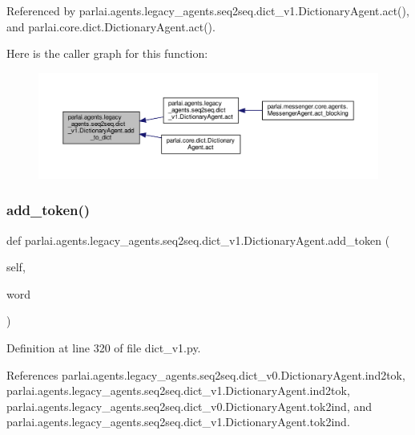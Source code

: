 Referenced by parlai.\+agents.\+legacy\+\_\+agents.\+seq2seq.\+dict\+\_\+v1.\+Dictionary\+Agent.\+act(), and parlai.\+core.\+dict.\+Dictionary\+Agent.\+act().

Here is the caller graph for this function\+:
\nopagebreak
\begin{figure}[H]
\begin{center}
\leavevmode
\includegraphics[width=350pt]{classparlai_1_1agents_1_1legacy__agents_1_1seq2seq_1_1dict__v1_1_1DictionaryAgent_a684aef1570f33b66b7513119359006c2_icgraph}
\end{center}
\end{figure}
\mbox{\label{classparlai_1_1agents_1_1legacy__agents_1_1seq2seq_1_1dict__v1_1_1DictionaryAgent_a35a084bb500ce45aa52786cdeddc49d7}} 
\subsubsection{\texorpdfstring{add\+\_\+token()}{add\_token()}}
{\footnotesize\ttfamily def parlai.\+agents.\+legacy\+\_\+agents.\+seq2seq.\+dict\+\_\+v1.\+Dictionary\+Agent.\+add\+\_\+token (\begin{DoxyParamCaption}\item[{}]{self,  }\item[{}]{word }\end{DoxyParamCaption})}



Definition at line 320 of file dict\+\_\+v1.\+py.



References parlai.\+agents.\+legacy\+\_\+agents.\+seq2seq.\+dict\+\_\+v0.\+Dictionary\+Agent.\+ind2tok, parlai.\+agents.\+legacy\+\_\+agents.\+seq2seq.\+dict\+\_\+v1.\+Dictionary\+Agent.\+ind2tok, parlai.\+agents.\+legacy\+\_\+agents.\+seq2seq.\+dict\+\_\+v0.\+Dictionary\+Agent.\+tok2ind, and parlai.\+agents.\+legacy\+\_\+agents.\+seq2seq.\+dict\+\_\+v1.\+Dictionary\+Agent.\+tok2ind.



